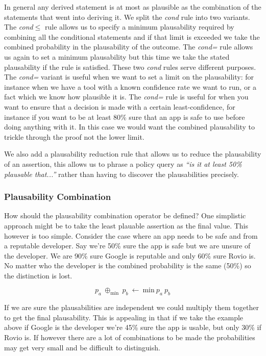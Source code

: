 \documentclass[thesis.tex]{subfiles}
\begin{document}
In general any derived statement is at most as plausible as the
combination of the statements that went into deriving it.  We split
the \emph{cond} rule into two variants.  The \emph{cond$\leq$} rule
allows us to specify a minimum plausability required by combining all
the conditional statements and if that limit is exceeded we take the
combined probability in the plausability of the outcome.  The
\emph{cond=} rule allows us again to set a minimum plausability but
this time we take the stated plausability if the rule is satisfied.
These two \emph{cond} rules serve different purposes.  The
\emph{cond=} variant is useful when we want to set a limit on the
plausability: for instance when we have a tool with a known confidence
rate we want to run, or a fact which we know how plausible it is.  The
\emph{cond=} rule is useful for when you want to ensure that a
decision is made with a certain least-confidence, for instance if you
want to be at least 80\% sure that an app is safe to use before doing
anything with it.  In this case we would want the combined
plausability to trickle through the proof not the lower limit.

We also add a plausability reduction rule that allows us to reduce the
plausability of an assertion, this allows us to phrase a policy query
as \emph{``is it at least 50\% plausable that...''} rather than having
to discover the plausabilities precisely.

\subsubsection{Plausability Combination}

How should the plausability combination operator be defined?  One
simplistic approach might be to take the least plauable assertion as
the final value.  This however is too simple. Consider the case where
an app needs to be safe and from a reputable developer.  Say we're
50\% sure the app is safe but we are unsure of the developer. We are
90\% sure Google is reputable and only 60\% sure Rovio is.  No matter
who the developer is the combined probability is the same (50\%) so
the distinction is lost.

\begin{equation*}
  p_a~\oplus_{\text{min}}~p_b~\gets~\text{min}~p_a~p_b
\end{equation*}

If we are sure the plausabilities are independent we could multiply
them together to get the final plausability. This is appealing in that
if we take the example above if Google is the developer we're 45\%
sure the app is usable, but only 30\% if Rovio is.  If however there
are a lot of combinations to be made the probabilities may get very
small and be difficult to distinguish.
\end{document}
